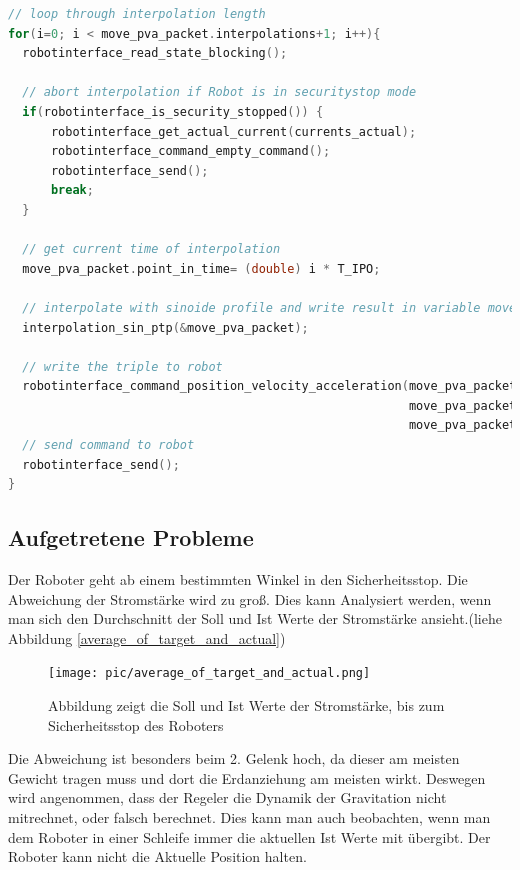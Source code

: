 \begin{lstlisting}[language=C,caption={Interpolation eines Berechneten Weges}, label=lst:interpolate,captionpos=b]
// loop through interpolation length  
for(i=0; i < move_pva_packet.interpolations+1; i++){
  robotinterface_read_state_blocking();

  // abort interpolation if Robot is in securitystop mode
  if(robotinterface_is_security_stopped()) {
      robotinterface_get_actual_current(currents_actual);
      robotinterface_command_empty_command();
      robotinterface_send();
      break;
  }

  // get current time of interpolation 
  move_pva_packet.point_in_time= (double) i * T_IPO;

  // interpolate with sinoide profile and write result in variable move_pva_packet
  interpolation_sin_ptp(&move_pva_packet);

  // write the triple to robot
  robotinterface_command_position_velocity_acceleration(move_pva_packet.pva.position,
                                                        move_pva_packet.pva.velocity,
                                                        move_pva_packet.pva.acceleration);
  // send command to robot
  robotinterface_send();
}
\end{lstlisting}

\subsection{Aufgetretene Probleme}
\label{sub:capi-problems_rel}

Der Roboter geht ab einem bestimmten Winkel in den Sicherheitsstop. Die Abweichung der Stromstärke wird zu groß. Dies kann Analysiert werden, wenn man sich den Durchschnitt der Soll und Ist Werte der Stromstärke ansieht.(liehe Abbildung \ref{average_of_target_and_actual})

\begin{figure}[ht]
  \centering
    \texttt{[image: pic/average\_of\_target\_and\_actual.png]}
      \caption[Soll und Ist Werte der Stromstärke]{Abbildung zeigt die Soll und Ist Werte der Stromstärke, bis zum Sicherheitsstop des Roboters}
      \label{fig:average_of_target_and_actual}
\end{figure}

Die Abweichung ist besonders beim 2. Gelenk hoch, da dieser am meisten Gewicht tragen muss und dort die Erdanziehung am meisten wirkt. Deswegen wird angenommen, dass der Regeler die Dynamik der Gravitation nicht mitrechnet, oder falsch berechnet. Dies kann man auch beobachten, wenn man dem Roboter in einer Schleife immer die aktuellen Ist Werte mit übergibt. Der Roboter kann nicht die Aktuelle Position halten.

